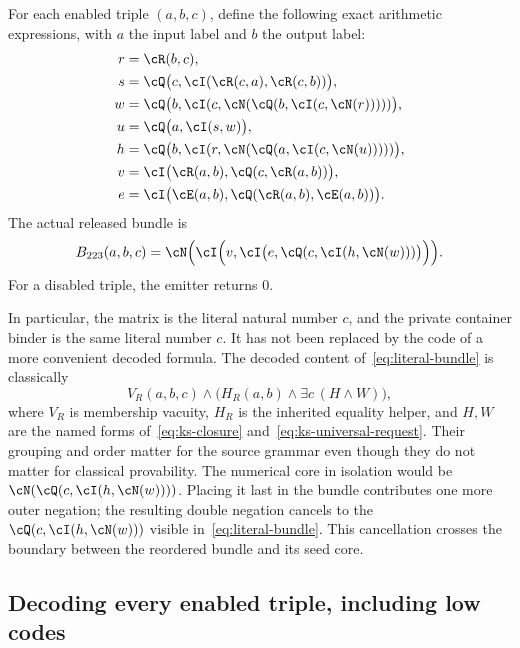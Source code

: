For each enabled triple $(a,b,c)$, define the following exact arithmetic
expressions, with $a$ the input label and $b$ the output label:
\begin{align}
 r&=\cR(b,c),\nonumber\\
 s&=\cQ\bigl(c,\cI(\cR(c,a),\cR(c,b))\bigr),\nonumber\\
 w&=\cQ\bigl(b,\cI(c,\cN(\cQ(b,\cI(c,\cN(r)))))\bigr),
 \label{eq:literal-w}\\
 u&=\cQ\bigl(a,\cI(s,w)\bigr),\nonumber\\
 h&=\cQ\bigl(b,\cI(r,\cN(\cQ(a,\cI(c,\cN(u)))))\bigr),
 \label{eq:literal-h}\\
 v&=\cI\bigl(\cR(a,b),\cQ(c,\cR(a,b))\bigr),\nonumber\\
 e&=\cI\bigl(\cE(a,b),\cQ(\cR(a,b),\cE(a,b))\bigr).
 \label{eq:literal-v-e}
\end{align}
The actual released bundle is
\begin{equation}
 B_{223}(a,b,c)=
 \cN\Bigl(\cI\Bigl(v,\cI\bigl(e,
                   \cQ(c,\cI(h,\cN(w)))\bigr)\Bigr)\Bigr).
 \label{eq:literal-bundle}
\end{equation}
For a disabled triple, the emitter returns $0$.

In particular, the matrix is the literal natural number $c$, and the
private container binder is the same literal number $c$.  It has not
been replaced by the code of a more convenient decoded formula.
The decoded content of~\eqref{eq:literal-bundle} is classically
\begin{equation}
 V_R(a,b,c)\land
 \bigl(H_R(a,b)\land\exists c\,(H\land W)\bigr),
 \label{eq:literal-bundle-content}
\end{equation}
where $V_R$ is membership vacuity, $H_R$ is the inherited equality helper,
and $H,W$ are the named forms of~\eqref{eq:ks-closure}
and~\eqref{eq:ks-universal-request}.  Their grouping and order matter
for the source grammar even though they do not matter for classical
provability.  The numerical core in isolation would be
$\cN(\cQ(c,\cI(h,\cN(w))))$.  Placing it last in the bundle contributes
one more outer negation; the resulting double negation cancels to the
$\cQ(c,\cI(h,\cN(w)))$ visible in~\eqref{eq:literal-bundle}.
This cancellation crosses the boundary between the reordered bundle and
its seed core.

\subsection{Decoding every enabled triple, including low codes}
\label{sec:ks-decoding}

